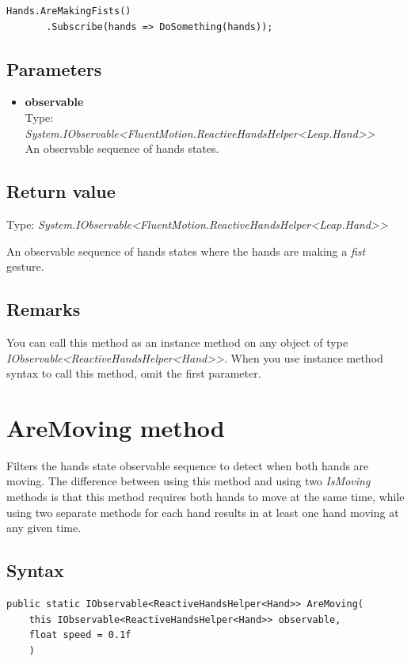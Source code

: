 \documentclass[12pt,a4paper,twoside]{report}
\begin{document}
\begin{lstlisting}[caption=Usage example]
  Hands.AreMakingFists()
       .Subscribe(hands => DoSomething(hands));
\end{lstlisting}

\subsection{Parameters}
\begin{itemize}
  \item \textbf{observable}\\
    Type: \textit{System.IObservable<FluentMotion.ReactiveHandsHelper<Leap.Hand>{}>}\\
    An observable sequence of hands states.
\end{itemize}

\subsection{Return value}
Type: \textit{System.IObservable<FluentMotion.ReactiveHandsHelper<Leap.Hand>{}>}

An observable sequence of hands states where the hands are making a \textit{fist} gesture.

\subsection{Remarks}
You can call this method as an instance method on any object of type \textit{IObservable<ReactiveHandsHelper<Hand>{}>}. When you use instance method syntax to call this method, omit the first parameter.

\section{AreMoving method}
Filters the hands state observable sequence to detect when both hands are moving. The difference between using this method and using two \textit{IsMoving} methods is that this method requires both hands to move at the same time, while using two separate methods for each hand results in at least one hand moving at any given time.

\subsection{Syntax}
\begin{lstlisting}[caption=Declaration]
  public static IObservable<ReactiveHandsHelper<Hand>> AreMoving(
    this IObservable<ReactiveHandsHelper<Hand>> observable,
    float speed = 0.1f
    )
\end{lstlisting}
\end{document}
